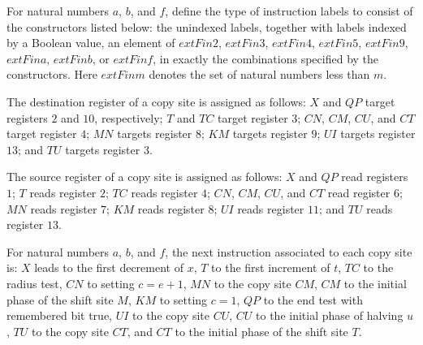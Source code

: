 \begin{definition}
\label{Complexity.PathHard.Lb}
\leanok
{}
For natural numbers $a$, $b$, and $f$, define the type of instruction labels to consist
of the constructors listed below: the unindexed labels, together with labels indexed by
a Boolean value, an element of $	ext{Fin }2$, $	ext{Fin }3$, $	ext{Fin }4$, $	ext{Fin
}5$, $	ext{Fin }9$, $	ext{Fin }a$, $	ext{Fin }b$, or $	ext{Fin }f$, in exactly the
combinations specified by the constructors. Here $	ext{Fin }m$ denotes the set of
natural numbers less than $m$.
\end{definition}

\begin{definition}
\label{Complexity.PathHard.cpDst}
\leanok
{}
The destination register of a copy site is assigned as follows: $X$ and $QP$ target
registers $2$ and $10$, respectively; $T$ and $TC$ target register $3$; $CN$, $CM$,
$CU$, and $CT$ target register $4$; $MN$ targets register $8$; $KM$ targets register
$9$; $UI$ targets register $13$; and $TU$ targets register $3$.
\end{definition}

\begin{definition}
\label{Complexity.PathHard.cpSrc}
\leanok
{}
The source register of a copy site is assigned as follows: $X$ and $QP$ read registers
$1$; $T$ reads register $2$; $TC$ reads register $4$; $CN$, $CM$, $CU$, and $CT$ read
register $6$; $MN$ reads register $7$; $KM$ reads register $8$; $UI$ reads register
$11$; and $TU$ reads register $13$.
\end{definition}

\begin{definition}
\label{Complexity.PathHard.cpNext}
\leanok
{}
For natural numbers $a$, $b$, and $f$, the next instruction associated to each copy site
is: $X$ leads to the first decrement of $x$, $T$ to the first increment of $t$, $TC$ to
the radius test, $CN$ to setting $c=e+1$, $MN$ to the copy site $CM$, $CM$ to the
initial phase of the shift site $M$, $KM$ to setting $c=1$, $QP$ to the end test with
remembered bit true, $UI$ to the copy site $CU$, $CU$ to the initial phase of halving
$u$, $TU$ to the copy site $CT$, and $CT$ to the initial phase of the shift site $T$.
\end{definition}

